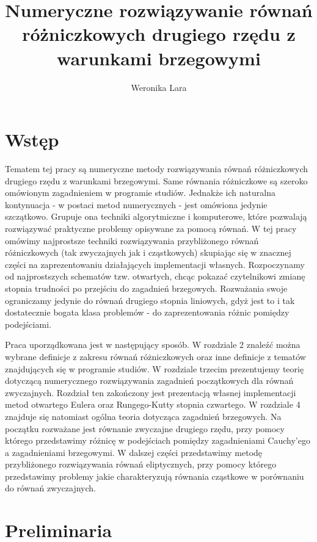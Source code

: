 \documentclass[12pt,a4paper]{report}
\author{Weronika Lara}
\title{Numeryczne rozwiązywanie równań różniczkowych drugiego rzędu z warunkami brzegowymi}
\begin{document}
\maketitle

\chapter{Wstęp}

Tematem tej pracy są numeryczne metody rozwiązywania równań różniczkowych drugiego rzędu z warunkami brzegowymi. Same równania różniczkowe są szeroko omówionym zagadnieniem w programie studiów. Jednakże ich naturalna kontynuacja - w postaci metod numerycznych - jest omówiona jedynie szczątkowo. Grupuje ona techniki algorytmiczne i komputerowe, które pozwalają rozwiązywać praktyczne problemy opisywane za pomocą równań. W tej pracy omówimy najprostsze techniki rozwiązywania przybliżonego równań różniczkowych (tak zwyczajnych jak i cząstkowych) skupiając się w znacznej części na zaprezentowaniu działających implementacji własnych. Rozpoczynamy od najprostszych schematów tzw. otwartych, chcąc pokazać czytelnikowi zmianę stopnia trudności po przejściu do zagadnień brzegowych. Rozważania swoje ograniczamy jedynie do równań drugiego stopnia liniowych, gdyż jest to i tak dostatecznie bogata klasa problemów - do zaprezentowania różnic pomiędzy podejściami. 

Praca uporządkowana jest w następujący sposób. W rozdziale 2 znaleźć można wybrane definicje z zakresu równań różniczkowych oraz inne definicje z tematów znajdujących się w programie studiów. W rozdziale trzecim prezentujemy teorię dotyczącą numerycznego rozwiązywania zagadnień początkowych dla równań zwyczajnych. Rozdział ten zakończony jest prezentacją własnej implementacji metod otwartego Eulera oraz Rungego-Kutty stopnia czwartego. W rozdziale 4 znajduje się natomiast ogólna teoria dotycząca zagadnień brzegowych. Na początku rozważane jest równanie zwyczajne drugiego rzędu, przy pomocy którego przedstawimy różnicę w podejściach pomiędzy zagadnieniami Cauchy'ego a zagadnieniami brzegowymi. W dalszej części przedstawimy metodę przybliżonego rozwiązywania równań eliptycznych, przy pomocy którego przedstawimy problemy jakie charakteryzują równania cząstkowe w porównaniu do równań zwyczajnych. 

\chapter{Preliminaria}
\end{document}
